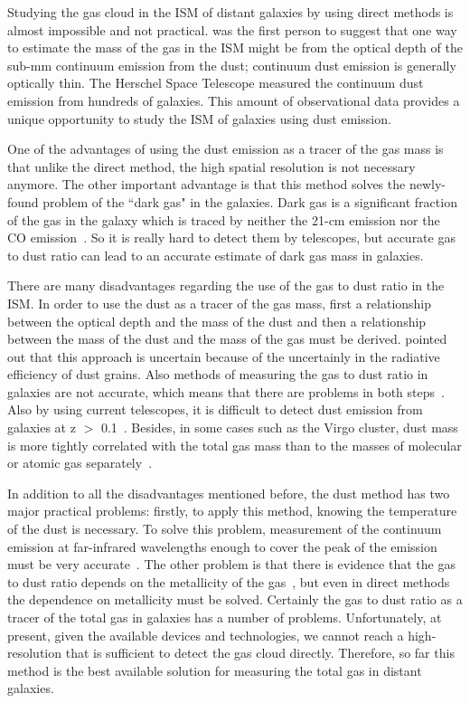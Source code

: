Studying the gas cloud in the ISM of distant galaxies by using direct methods is almost impossible and not practical. 
\cite{Hildebran83} was the first person to suggest that one way to estimate the mass of the gas in the ISM might be from the optical depth of the sub-mm continuum emission from the dust; continuum dust emission is generally optically thin. 
The Herschel Space Telescope \cite{Pilbratt10} measured the continuum dust emission from hundreds of galaxies\citep{Eales10, Oliver12}. 
This amount of observational data provides a unique opportunity to study the ISM of galaxies using dust emission. 

One of the advantages of using the dust emission as a tracer of the gas mass is that unlike the direct method, the high spatial resolution is not necessary anymore. 
The other important advantage is that this method solves the newly-found problem of the ``dark gas" in the galaxies. 
Dark gas is a significant fraction of the gas in the galaxy which is traced by neither the 21-cm emission nor the CO emission~\citep{Abdo10}. 
So it is really hard to detect them by telescopes, but accurate gas to dust ratio can lead to an accurate estimate of dark gas mass in galaxies. 

There are many disadvantages regarding the use of the gas to dust ratio in the ISM.
In order to use the dust as a tracer of the gas mass, first a relationship between the optical depth and the mass of the dust and then a relationship between the mass of the dust and the mass of the gas must be derived. \cite{Draine03} pointed out that this approach is uncertain because of the uncertainly in the radiative efficiency of dust grains. 
Also methods of measuring the gas to dust ratio in galaxies are not accurate, which means that there are problems in both steps~\citep{Hildebran83}. 
Also by using current telescopes, it is difficult to detect dust emission from galaxies at z $>$ 0.1~\citep{Ealas12}. 
Besides, in some cases such as the Virgo cluster, dust mass is more tightly correlated with the total gas mass than to the masses of molecular or atomic gas separately~\citep{Corbelli11}. 

In addition to all the disadvantages mentioned before, the dust method has two major practical problems: firstly, to apply this method, knowing the temperature of the dust is necessary. 
To solve this problem, measurement of the continuum emission at far-infrared wavelengths enough to cover the peak of the emission must be very accurate~\citep{Ealas12}. 
The other problem is that there is evidence that the gas to dust ratio depends on the metallicity of the gas~\citep{Lisenfeld98, Draine07}, but even in direct methods the dependence on metallicity must be solved. 
Certainly the gas to dust ratio as a tracer of the total gas in galaxies has a number of problems. 
Unfortunately, at present, given the available devices and technologies, we cannot reach a high-resolution that is sufficient to detect the gas cloud directly.
Therefore, so far this method is the best available solution for measuring the total gas in distant galaxies. 

